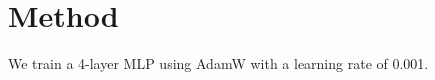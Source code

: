 \section{Method}
\label{sec:method}
We train a 4-layer MLP using AdamW with a learning rate of 0.001.
